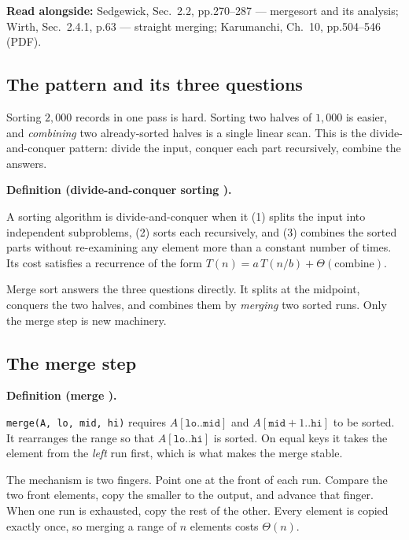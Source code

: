\documentclass[11pt]{article}
\newenvironment{definitionbox}[1]{%
  \par\noindent\textbf{Definition (#1).}\ \itshape
}{\par\vspace{0.3em}}
\begin{document}
\textbf{Read alongside:} Sedgewick, Sec.~2.2, pp.270--287 --- mergesort and its analysis; Wirth, Sec.~2.4.1, p.63 --- straight merging; Karumanchi, Ch.~10, pp.504--546 (PDF).

\subsection{The pattern and its three questions}

Sorting $2{,}000$ records in one pass is hard. Sorting two halves of $1{,}000$ is easier, and \emph{combining} two already-sorted halves is a single linear scan. This is the divide-and-conquer pattern: divide the input, conquer each part recursively, combine the answers.

\begin{definitionbox}{divide-and-conquer sorting \cite{AhoHopcroftUllman1983_data_structures_algorithms}}
A sorting algorithm is divide-and-conquer when it (1) splits the input into independent subproblems, (2) sorts each recursively, and (3) combines the sorted parts without re-examining any element more than a constant number of times. Its cost satisfies a recurrence of the form $T(n) = a\,T(n/b) + \Theta(\text{combine})$.
\end{definitionbox}

Merge sort answers the three questions directly. It splits at the midpoint, conquers the two halves, and combines them by \emph{merging} two sorted runs. Only the merge step is new machinery.

\subsection{The merge step}

\begin{definitionbox}{merge \cite{Sedgewick2011_algorithms,Wirth2004_algorithms_data_structures}}
\texttt{merge(A, lo, mid, hi)} requires $A[\texttt{lo}..\texttt{mid}]$ and $A[\texttt{mid}+1..\texttt{hi}]$ to be sorted. It rearranges the range so that $A[\texttt{lo}..\texttt{hi}]$ is sorted. On equal keys it takes the element from the \emph{left} run first, which is what makes the merge stable.
\end{definitionbox}

The mechanism is two fingers. Point one at the front of each run. Compare the two front elements, copy the smaller to the output, and advance that finger. When one run is exhausted, copy the rest of the other. Every element is copied exactly once, so merging a range of $n$ elements costs $\Theta(n)$.
\end{document}
